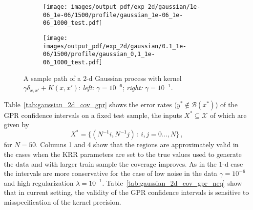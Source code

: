 \documentclass[a4paper,14pt]{extarticle}
\newcommand{\Bcal}{\mathcal{B}}
\newcommand{\Xcal}{\mathcal{X}}
\begin{document}
\begin{figure}%
  \centering
  \begin{subfigure}[b]{0.5\linewidth}
    \texttt{[image: images/output\_pdf/exp\_2d/gaussian/1e-06\_1e-06/1500/profile/gaussian\_1e-06\_1e-06\_1000\_test.pdf]}
  \end{subfigure}%
  \begin{subfigure}[b]{0.5\linewidth}
    \texttt{[image: images/output\_pdf/exp\_2d/gaussian/0.1\_1e-06/1500/profile/gaussian\_0,1\_1e-06\_1000\_test.pdf]}
  \end{subfigure}
  \caption{A sample path of a $2$-d Gaussian process with kernel $\gamma \delta_{x,x'} + K(x,x')$:
  \textit{left:} $\gamma=10^{-6}$; \textit{right:} $\gamma=10^{-1}$.}
  \label{fig:gauss_2d_profile}
\end{figure}

Table~\ref{tab:gaussian_2d_cov_gpr} shows the error rates ($y^*\notin\Bcal(x^*)$) of
the GPR confidence intervals on a fixed test sample, the inputs $X^*\subseteq \Xcal$
of which are given by
\begin{equation*}
  X^* = \bigl\{(N^{-1} i, N^{-1} j)\,:\,i,j=0\ldots, N\bigr\} \,,
\end{equation*}
for $N=50$. Columns 1 and 4 show that the regions are approximately valid in the
cases when the KRR parameters are set to the true values used to generate the data
and with larger train sample the coverage improves. As in the $1$-d case the intervals
are more conservative for the case of low noise in the data $\gamma=10^{-6}$ and
high regularization $\lambda=10^{-1}$. Table~\ref{tab:gaussian_2d_cov_gpr_neq} show
that in current setting, the validity of the GPR confidence intervals is sensitive
to misspecification of the kernel precision.
\end{document}
